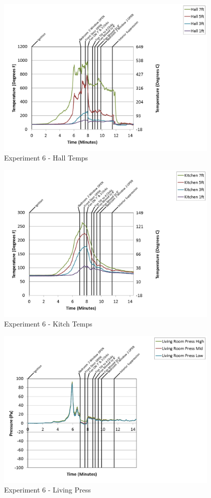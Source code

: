 \documentclass{article}
\begin{document}
\begin{appendices}
\begin{figure}[h!]
	\centering
	\includegraphics[height=3.05in]{0_Images/Results_Charts/Exp_6_Charts/HallTemps.png}
	\caption{Experiment 6 - Hall Temps}
\end{figure}

\clearpage

\begin{figure}[h!]
	\centering
	\includegraphics[height=3.05in]{0_Images/Results_Charts/Exp_6_Charts/KitchTemps.png}
	\caption{Experiment 6 - Kitch Temps}
\end{figure}


\begin{figure}[h!]
	\centering
	\includegraphics[height=3.05in]{0_Images/Results_Charts/Exp_6_Charts/LivingPress.png}
	\caption{Experiment 6 - Living Press}
\end{figure}


\end{appendices}
\end{document}
